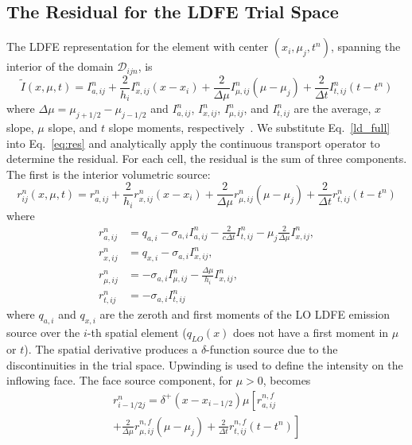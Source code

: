 \documentclass{anstrans}
\begin{document}
\subsection{The Residual for the LDFE Trial Space}
\label{app:res}

The LDFE representation for the element with center $(x_i,\mu_j, t^n)$, spanning the interior of the domain
$\mathcal{D}_{ijn}$, is 
\begin{equation}\label{ld_full}
    \tilde I(x,\mu,t) = I_{a,ij}^{n} + \frac{2}{h_{i}}I_{x,ij}^{n}\left(x-x_i\right) +
    \frac{2}{\Delta \mu}I_{\mu,ij}^n\left(\mu-\mu_j\right) +
    \frac{2}{\Delta t}I_{t,ij}^{n}\left(t-t^{n}\right)
\end{equation}
where $\Delta \mu = \mu_{j+1/2} - \mu_{j-1/2}$ and $I_{a,ij}^n$, $I_{x,ij}^n$, $I_{\mu,ij}^n$, and 
$I_{t,ij}^n$ are the average, $x$ slope, $\mu$ slope, and $t$ slope moments,
respectively~\cite{dissertation}.   We substitute
Eq.~\eqref{ld_full} into Eq.~\eqref{eq:res} and analytically apply the continuous transport operator to determine the
residual.  For each cell, the residual is the sum of three components.  The first is the interior volumetric source:
\begin{equation}
    r_{ij}^{n}(x,\mu,t) = r_{a,ij}^n + \frac{2}{h_i}r_{x,ij}^n\left(x-x_i\right) + 
    \frac{2}{\Delta \mu}r_{\mu,ij}^n\left(\mu-\mu_j\right) +
    \frac{2}{\Delta t}r_{t,ij}^{n}\left(t-t^{n}\right)
\end{equation}
where
\begin{align}
    r_{a,ij}^n &= q_{a,i} - \sigma_{a,i}I^n_{a,ij} - \frac{2}{c \Delta t} I_{t,ij}^n - \mu_{j}\frac{2}{\Delta
    \mu}I_{x,ij}^n, \\ 
    r_{x,ij}^n &= q_{x,i} - \sigma_{a,i}I^n_{x,ij}, \\ 
    r_{\mu,ij}^n &= -\sigma_{a,i}I^{n}_{\mu,ij} - \frac{\Delta \mu}{h_{i}}I^{n}_{x,ij}, \\
    r_{t,ij}^n &= -\sigma_{a,i}I^{n}_{t,ij}
\end{align}
where $q_{a,i}$ and $q_{x,i}$ are the zeroth and first moments of the LO LDFE emission source over the
$i$-th spatial element ($q_{LO}(x)$ does not have a first moment in $\mu$ or $t$).  The spatial derivative produces a
$\delta$-function source due to the discontinuities in the trial space. Upwinding is used to define the
intensity on the inflowing face.  The face source component, for $\mu>0$, becomes
\begin{multline}
    r_{i-1/2j}^{n} = \delta^+(x-x_{i-1/2}) \mu \left[ r_{a,ij}^{n,f}  \right.
 \\   \left. + \frac{2}{\Delta \mu} r_{\mu,ij}^{n,f} \left(\mu - \mu_j\right) +
    \frac{2}{\Delta t}r_{t,ij}^{n,f}\left(t - t^{n}\right)\right] 
\end{multline}
\end{document}
